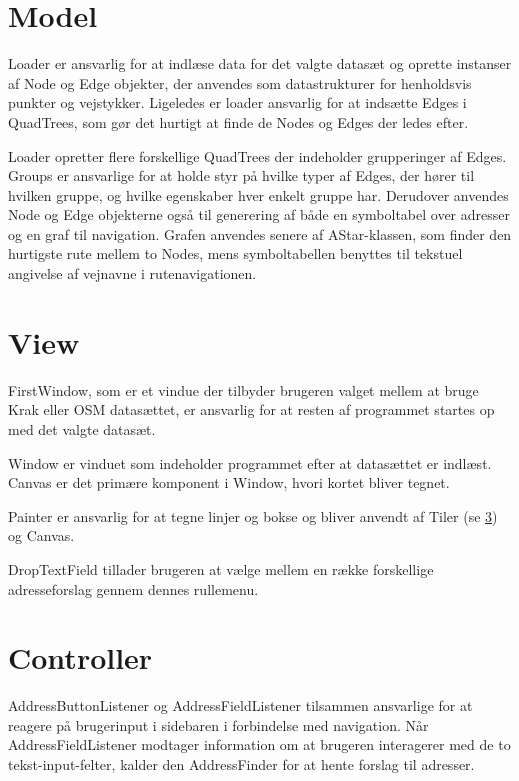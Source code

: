 \section{Model}
\label{sec:model}

Loader er ansvarlig for at indlæse data for det valgte datasæt og oprette instanser af Node og Edge objekter, der anvendes som datastrukturer for henholdsvis punkter og vejstykker. Ligeledes er loader ansvarlig for at indsætte Edges i QuadTrees, som gør det hurtigt at finde de Nodes og Edges der ledes efter.

Loader opretter flere forskellige QuadTrees der indeholder grupperinger af Edges. Groups er ansvarlige for at holde styr på hvilke typer af Edges, der hører til hvilken gruppe, og hvilke egenskaber hver enkelt gruppe har. Derudover anvendes Node og Edge objekterne også til generering af både en symboltabel over adresser og en graf til navigation. Grafen anvendes senere af AStar-klassen, som finder den hurtigste rute mellem to Nodes, mens symboltabellen benyttes til tekstuel angivelse af vejnavne i rutenavigationen.
	
\section{View}
\label{sec:view}

FirstWindow, som er et vindue der tilbyder brugeren valget mellem at bruge Krak eller OSM datasættet, er ansvarlig for at resten af programmet startes op med det valgte datasæt.

Window er vinduet som indeholder programmet efter at datasættet er indlæst. Canvas er det primære komponent i Window, hvori kortet bliver tegnet.

Painter er ansvarlig for at tegne linjer og bokse og bliver anvendt af Tiler (se \ref{sec:controller}) og Canvas.

DropTextField tillader brugeren at vælge mellem en række forskellige adresseforslag gennem dennes rullemenu.

\section{Controller}
\label{sec:controller}

AddressButtonListener og AddressFieldListener tilsammen ansvarlige for at reagere på brugerinput i sidebaren i forbindelse med navigation. Når AddressFieldListener modtager information om at brugeren interagerer med de to tekst-input-felter, kalder den AddressFinder for at hente forslag til adresser.

